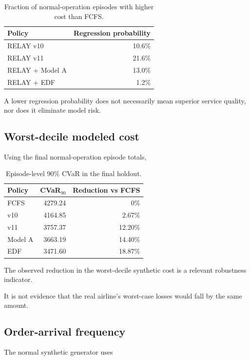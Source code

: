 \documentclass[10pt,a4paper]{article}
\theoremstyle{plain}
\theoremstyle{definition}
\theoremstyle{remark}
\begin{document}
\begin{table}[!htbp]
\centering
\caption{
Fraction of normal-operation episodes
with higher cost than FCFS.
}
\small
\begin{tabular}{@{}lr@{}}
\toprule
Policy & Regression probability \\
\midrule
RELAY v10 & 10.6\% \\
RELAY v11 & 21.6\% \\
RELAY + Model A & 13.0\% \\
RELAY + EDF & 1.2\% \\
\bottomrule
\end{tabular}
\end{table}

A lower regression probability does not
necessarily mean superior service quality,
nor does it eliminate model risk.

\subsection{Worst-decile modeled cost}

Using the final normal-operation
episode totals,

\begin{table}[!htbp]
\centering
\caption{
Episode-level 90\% CVaR
in the final holdout.
}
\small
\begin{tabular}{@{}lrr@{}}
\toprule
Policy &
CVaR$_{90}$ &
Reduction vs FCFS \\
\midrule
FCFS & 4279.24 & 0\% \\
v10 & 4164.85 & 2.67\% \\
v11 & 3757.37 & 12.20\% \\
Model A & 3663.19 & 14.40\% \\
EDF & 3471.60 & 18.87\% \\
\bottomrule
\end{tabular}
\end{table}

The observed reduction in the
worst-decile synthetic cost is
a relevant robustness indicator.

It is not evidence that the real
airline's worst-case losses
would fall by the same amount.

\subsection{Order-arrival frequency}

The normal synthetic generator uses
\end{document}
